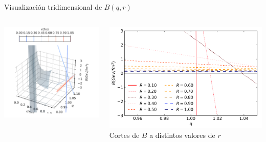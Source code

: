 \documentclass{beamer}
\begin{document}
\begin{frame}{Visualización tridimensional de \( B(q, r) \)}
\begin{columns}
    \includegraphics[width=\linewidth]{figures/B(q)-different-r.png}

    \includegraphics[width=\linewidth]{figures/B(q)-different-r-cuts.png}
    \vspace{0.1cm}
    \centering \scriptsize{Cortes de \( B \) a distintos valores de \( r \)}
  \end{columns}
\end{frame}
\end{document}
